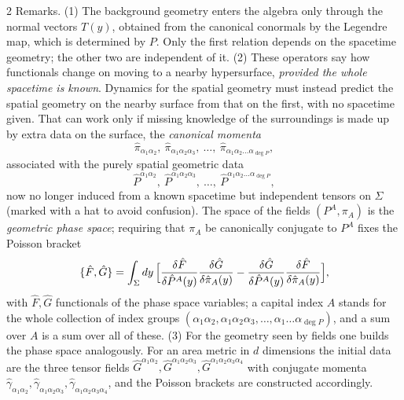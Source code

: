 \begin{paracol}{2}
Remarks. (1) The background geometry enters the algebra only through the normal vectors $T(y)$, obtained from the canonical conormals by the Legendre map, which is determined by $P$. Only the first relation depends on the spacetime geometry; the other two are independent of it. (2) These operators say how functionals change on moving to a nearby hypersurface, \emph{provided the whole spacetime is known}. Dynamics for the spatial geometry must instead predict the spatial geometry on the nearby surface from that on the first, with no spacetime given. That can work only if missing knowledge of the surroundings is made up by extra data on the surface, the \emph{canonical momenta}
\[
  \hat\pi_{\alpha_1\alpha_2},\ \hat\pi_{\alpha_1\alpha_2\alpha_3},\ \dots,\ \hat\pi_{\alpha_1\alpha_2\dots\alpha_{\deg P}},
\]
associated with the purely spatial geometric data
\[
  \hat P^{\alpha_1\alpha_2},\ \hat P^{\alpha_1\alpha_2\alpha_3},\ \dots,\ \hat P^{\alpha_1\alpha_2\dots\alpha_{\deg P}},
\]
now no longer induced from a known spacetime but independent tensors on $\Sigma$ (marked with a hat to avoid confusion). The space of the fields $(P^A,\pi_A)$ is the \emph{geometric phase space}; requiring that $\pi_A$ be canonically conjugate to $P^A$ fixes the Poisson bracket
\[
  \{\hat F,\hat G\}=\int_\Sigma dy\,\Bigl[\frac{\delta\hat F}{\delta\hat P^A(y)}\frac{\delta\hat G}{\delta\hat\pi_A(y)}-\frac{\delta\hat G}{\delta\hat P^A(y)}\frac{\delta\hat F}{\delta\hat\pi_A(y)}\Bigr],
\]
with $\hat F,\hat G$ functionals of the phase space variables; a capital index $A$ stands for the whole collection of index groups $(\alpha_1\alpha_2,\alpha_1\alpha_2\alpha_3,\dots,\alpha_1\dots\alpha_{\deg P})$, and a sum over $A$ is a sum over all of these. (3) For the geometry seen by fields one builds the phase space analogously. For an area metric in $d$ dimensions the initial data are the three tensor fields $\hat G^{\alpha_1\alpha_2},\hat G^{\alpha_1\alpha_2\alpha_3},\hat G^{\alpha_1\alpha_2\alpha_3\alpha_4}$ with conjugate momenta $\hat\gamma_{\alpha_1\alpha_2},\hat\gamma_{\alpha_1\alpha_2\alpha_3},\hat\gamma_{\alpha_1\alpha_2\alpha_3\alpha_4}$, and the Poisson brackets are constructed accordingly.


\end{paracol}
